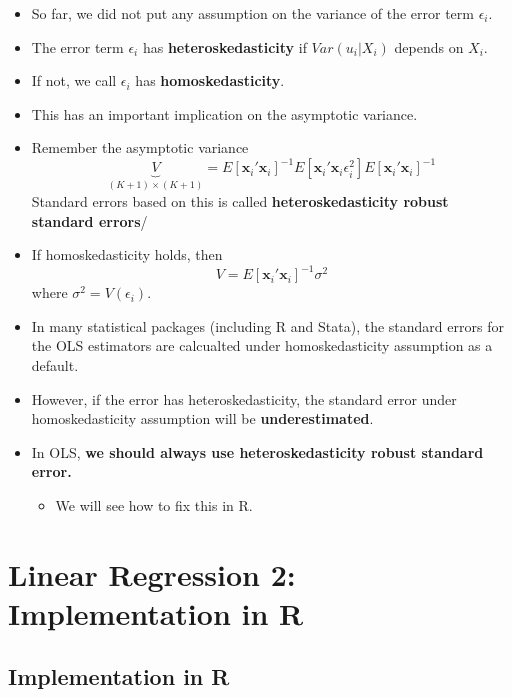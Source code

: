 \documentclass[]{book}
\providecommand{\tightlist}{%
  \setlength{\itemsep}{0pt}\setlength{\parskip}{0pt}}
\begin{document}
\begin{itemize}
\tightlist
\item
  So far, we did not put any assumption on the variance of the error term \(\epsilon_i\).
\item
  The error term \(\epsilon_{i}\) has \textbf{heteroskedasticity} if \(Var(u_{i}|X_{i})\) depends on \(X_{i}\).
\item
  If not, we call \(\epsilon_{i}\) has \textbf{homoskedasticity}.
\item
  This has an important implication on the asymptotic variance.
\item
  Remember the asymptotic variance
  \[
    \underbrace{V}_{(K+1)\times(K+1)}
     = E[\mathbf{x}_{i}'\mathbf{x}_{i}]^{-1}E[\mathbf{x}_{i}'\mathbf{x}_{i}\epsilon_{i}^{2}]E[\mathbf{x}_{i}'\mathbf{x}_{i}]^{-1}
    \]
  Standard errors based on this is called \textbf{heteroskedasticity robust standard errors}/
\item
  If homoskedasticity holds, then
  \[
    V = E[\mathbf{x}_{i}'\mathbf{x}_{i}]^{-1}\sigma^{2}
    \]
  where \(\sigma^2 = V(\epsilon_i)\).
\item
  In many statistical packages (including R and Stata), the standard errors for the OLS estimators are calcualted under homoskedasticity assumption as a default.
\item
  However, if the error has heteroskedasticity, the standard error under homoskedasticity assumption will be \textbf{underestimated}.
\item
  In OLS, \textbf{we should always use heteroskedasticity robust standard error.}

  \begin{itemize}
  \tightlist
  \item
    We will see how to fix this in R.
  \end{itemize}
\end{itemize}

\hypertarget{linear-regression-2-implementation-in-r}{%
\chapter{Linear Regression 2: Implementation in R}\label{linear-regression-2-implementation-in-r}}

\hypertarget{implementation-in-r}{%
\section{Implementation in R}\label{implementation-in-r}}
\end{document}
